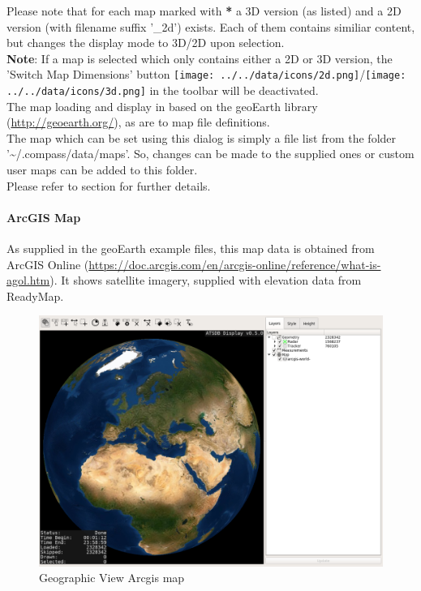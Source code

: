  Please note that for each map marked with \textbf{*} a 3D version (as listed) and a 2D version (with filename suffix '\_2d') exists. Each of them contains similiar content, but changes the display mode to 3D/2D upon selection. \\

 \textbf{Note}: If a map is selected which only contains either a 2D or 3D version, 
 the 'Switch Map Dimensions' button \texttt{[image: ../../data/icons/2d.png]}/\texttt{[image: ../../data/icons/3d.png]} in the toolbar will be deactivated.\\
 
The map loading and display in based on the geoEarth library (\url{http://geoearth.org/}), as are to map file definitions.  \\

The map which can be set using this dialog is simply a file list from the folder '\textasciitilde/.compass/data/maps'. So, changes can be made to the supplied ones or custom user maps can be added to this folder. \\
Please refer to section  for further details.

\newpage
\paragraph{ArcGIS Map}

As supplied in the geoEarth example files, this map data is obtained from ArcGIS Online (\url{https://doc.arcgis.com/en/arcgis-online/reference/what-is-agol.htm}). It shows satellite imagery, supplied with elevation data from ReadyMap. 

\begin{figure}[H]
    \hspace*{-2.5cm}
    \includegraphics[width=19cm,frame]{figures/geoview_arcgis.png}
  \caption{Geographic View Arcgis map}
\end{figure}

